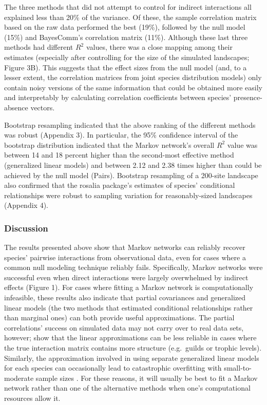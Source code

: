 The three methods that did not attempt to control for indirect
interactions all explained less than 20\% of the variance. Of these, the
sample correlation matrix based on the raw data performed the best
(19\%), followed by the null model (15\%) and BayesComm's correlation
matrix (11\%). Although these last three methods had different \(R^2\)
values, there was a close mapping among their estimates (especially
after controlling for the size of the simulated landscapes; Figure 3B).
This suggests that the effect sizes from the null model (and, to a
lesser extent, the correlation matrices from joint species distribution
models) only contain noisy versions of the same information that could
be obtained more easily and interpretably by calculating correlation
coefficients between species' presence-absence vectors.

Bootstrap resampling indicated that the above ranking of the different
methods was robust (Appendix 3). In particular, the 95\% confidence
interval of the bootstrap distribution indicated that the Markov
network's overall \(R^2\) value was between 14 and 18 percent higher
than the second-most effective method (generalized linear models) and
between 2.12 and 2.38 times higher than could be achieved by the null
model (Pairs). Bootstrap resampling of a 200-site landscape also
confirmed that the rosalia package's estimates of species' conditional
relationships were robust to sampling variation for reasonably-sized
landscapes (Appendix 4).

\subsubsection{Discussion}\label{discussion}

The results presented above show that Markov networks can reliably
recover species' pairwise interactions from observational data, even for
cases where a common null modeling technique reliably fails.
Specifically, Markov networks were successful even when direct
interactions were largely overwhelmed by indirect effects (Figure 1).
For cases where fitting a Markov network is computationally infeasible,
these results also indicate that partial covariances and generalized
linear models (the two methods that estimated conditional relationships
rather than marginal ones) can both provide useful approximations. The
partial correlations' success on simulated data may not carry over to
real data sets, however; \citet{loh_structure_2013} show that the linear
approximations can be less reliable in cases where the true interaction
matrix contains more structure (e.g.~guilds or trophic levels).
Similarly, the approximation involved in using separate generalized
linear models for each species can occasionally lead to catastrophic
overfitting with small-to-moderate sample sizes
\citep{lee_learning_2012}. For these reasons, it will usually be best to
fit a Markov network rather than one of the alternative methods when
one's computational resources allow it.

